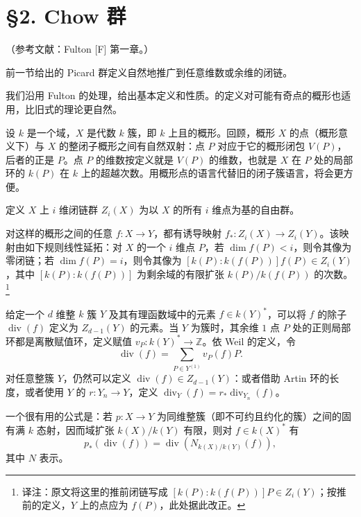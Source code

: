 \section*{§2. Chow 群}
（参考文献：Fulton [F] 第一章。）

前一节给出的 Picard 群定义自然地推广到任意维数或余维的闭链。

我们沿用 Fulton 的处理，给出基本定义和性质。的定义对可能有奇点的概形也适用，比旧式的理论更自然。

设 $k$ 是一个域，$X$ 是代数 $k$ 簇，即 $k$ 上且的概形。回顾，概形 $X$ 的点（概形意义下）与 $X$ 的整闭子概形之间有自然双射：点 $P$ 对应于它的概形闭包 $V(P)$，后者的正是 $P$。点 $P$ 的维数按定义就是 $V(P)$ 的维数，也就是 $X$ 在 $P$ 处的局部环的 $k(P)$ 在 $k$ 上的超越次数。用概形点的语言代替旧的闭子簇语言，将会更方便。

定义 $X$ 上 $i$ 维闭链群 $Z_i(X)$ 为以 $X$ 的所有 $i$ 维点为基的自由群。

对这样的概形之间的任意 $f:X\longrightarrow Y$，都有诱导映射 $f_*:Z_i(X)\longrightarrow Z_i(Y)$。该映射由如下规则线性延拓：对 $X$ 的一个 $i$ 维点 $P$，若 $\dim f(P)<i$，则令其像为零闭链；若 $\dim f(P)=i$，则令其像为 $[k(P):k(f(P))]f(P)\in Z_i(Y)$，其中 $[k(P):k(f(P))]$ 为剩余域的有限扩张 $k(P)/k(f(P))$ 的次数。\footnote{译注：原文将这里的推前闭链写成 $[k(P):k(f(P))]P\in Z_i(Y)$；按推前的定义，$Y$ 上的点应为 $f(P)$，此处据此改正。}

给定一个 $d$ 维整 $k$ 簇 $Y$ 及其有理函数域中的元素 $f\in k(Y)^*$，可以将 $f$ 的除子 $\operatorname{div}(f)$ 定义为 $Z_{d-1}(Y)$ 的元素。当 $Y$ 为簇时，其余维 $1$ 点 $P$ 处的正则局部环都是离散赋值环，定义赋值 $v_P:k(Y)^*\longrightarrow\mathbb Z$。依 Weil 的定义，令
\[
\operatorname{div}(f)=\sum_{P\in Y^{(1)}}v_P(f)P.
\]
对任意整簇 $Y$，仍然可以定义 $\operatorname{div}(f)\in Z_{d-1}(Y)$：或者借助 Artin 环的长度，或者使用 $Y$ 的 $r:Y_n\longrightarrow Y$，定义 $\operatorname{div}_Y(f)=r_*\operatorname{div}_{Y_n}(f)$。

一个很有用的公式是：若 $p:X\longrightarrow Y$ 为同维整簇（即不可约且约化的簇）之间的固有满 $k$ 态射，因而域扩张 $k(X)/k(Y)$ 有限，则对 $f\in k(X)^*$ 有
\[
p_*(\operatorname{div}(f))=\operatorname{div}(N_{k(X)/k(Y)}(f)),
\]
其中 $N$ 表示。

